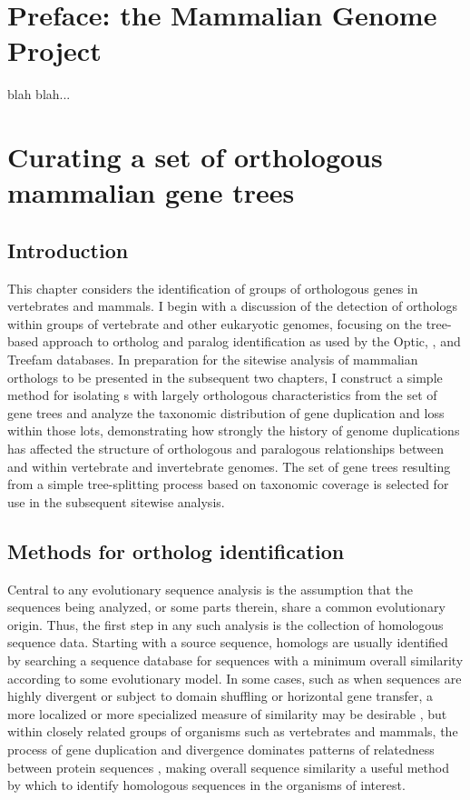 \chapter*{Preface: the Mammalian Genome Project}

blah blah...

\chapter{Curating a set of orthologous mammalian gene trees}
\label{ch_orthologs}
\acresetall

\section{Introduction}

This chapter considers the identification of groups of orthologous
genes in vertebrates and mammals. I begin with a discussion of the
detection of orthologs within groups of vertebrate and other
eukaryotic genomes, focusing on the tree-based approach to ortholog
and paralog identification as used by the Optic, \cmp, and Treefam
databases. In preparation for the sitewise analysis of mammalian
orthologs to be presented in the subsequent two chapters, I construct
a simple method for isolating \subtr{}s with largely orthologous
characteristics from the set of \cmp gene trees and analyze the
taxonomic distribution of gene duplication and loss within those
\acp{lot}, demonstrating how strongly the history of genome
duplications has affected the structure of orthologous and paralogous
relationships between and within vertebrate and invertebrate
genomes. The set of gene trees resulting from a simple tree-splitting
process based on taxonomic coverage is selected for use in the
subsequent sitewise analysis.

\section{Methods for ortholog identification}

Central to any evolutionary sequence analysis is the assumption that
the sequences being analyzed, or some parts therein, share a common
evolutionary origin. Thus, the first step in any such analysis is the
collection of homologous sequence data. Starting with a source
sequence, homologs are usually identified by searching a sequence
database for sequences with a minimum overall similarity according to
some evolutionary model. In some cases, such as when sequences are
highly divergent or subject to domain shuffling or horizontal gene
transfer, a more localized or more specialized measure of similarity
may be desirable \citep{Koonin2001,Sjolander2011}, but within closely
related groups of organisms such as vertebrates and mammals, the
process of gene duplication and divergence dominates patterns of
relatedness between protein sequences \citep{Ohno1970}, making overall
sequence similarity a useful method by which to identify homologous
sequences in the organisms of interest.

